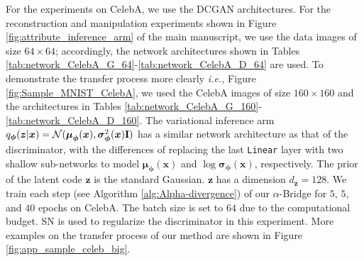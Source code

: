 \documentclass[letterpaper]{article} %
\newcommand{\Nc}[0]{\ensuremath{\mathcal{N}} }
\newcommand{\ie}[0]{\emph{i.e., }}
\newcommand{\Imat}[0]{\ensuremath{{\bf I}} }
\newcommand{\xv}[0]{\ensuremath{\boldsymbol{x}} }
\newcommand{\zv}[0]{\ensuremath{\boldsymbol{z}} }
\newcommand{\muv}[0]{\ensuremath{\boldsymbol{\mu}} }
\newcommand{\sigmav}[0]{\ensuremath{\boldsymbol{\sigma}} }
\newcommand{\phiv}[0]{\ensuremath{\boldsymbol{\phi}} }
\begin{document}
For the experiments on CelebA, we use the DCGAN \cite{radford2015unsupervised} architectures.
For the reconstruction and manipulation experiments shown in Figure \ref{fig:attribute_inference_arm} of the main manuscript, we use the data images of size $64 \times 64$; accordingly, the network architectures shown in Tables \ref{tab:network_CelebA_G_64}-\ref{tab:network_CelebA_D_64} are used. 
To demonstrate the transfer process more clearly \ie Figure \ref{fig:Sample_MNIST_CelebA}, we used the CelebA images of size $160 \times 160$ and the architectures in Tables \ref{tab:network_CelebA_G_160}-\ref{tab:network_CelebA_D_160}.
The variational inference arm $q_{\phiv}(\zv|\xv)=\Nc(\muv_{\phiv}(\xv), \sigmav^2_{\phiv}(\xv)\Imat)$ has a similar network architecture as that of the discriminator, with the differences of replacing the last {\tt Linear} layer with two shallow sub-networks to model $\muv_{\phiv}(\xv)$ and $\log\sigmav_{\phiv}(\xv)$, respectively.
The prior of the latent code $\zv$ is the standard Gaussian. $\zv$ has a dimension $d_{\zv}=128$. 
We train each step (see Algorithm \ref{alg:Alpha-divergence}) of our $\alpha$-Bridge for $5$, $5$, and $40$ epochs on CelebA.
The batch size is set to $64$ due to the computational budget.
SN is used to regularize the discriminator in this experiment. More examples on the transfer process of our method are shown in Figure \ref{fig:app_sample_celeb_big}.
\end{document}
